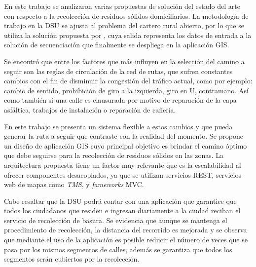 
En este trabajo se analizaron varias propuestas de solución del estado del arte con respecto a la recolección de residuos sólidos domiciliarios. La metodología de trabajo en la DSU se ajusta al problema del cartero rural abierto, por lo que se utiliza la solución propuesta por \citet{Braier2017AnArgentina}, cuya salida representa los datos de entrada a la solución de secuenciación que finalmente se despliega en la aplicación GIS.

Se encontró que entre los factores que más influyen en la selección del camino a seguir son las reglas de circulación de la red de rutas, que sufren constantes cambios con el fin de disminuir la congestión del tráfico actual, como por ejemplo: cambio de sentido, prohibición de giro a la izquierda, giro en U, contramano. Así como también si una calle es clausurada por motivo de reparación de la capa asfáltica, trabajos de instalación o reparación de cañería.

En este trabajo se presenta un sistema flexible a estos cambios y que pueda generar la ruta a seguir que contraste con la realidad del momento. Se propone un diseño de aplicación GIS cuyo principal objetivo es brindar el camino óptimo que debe seguirse para la recolección de residuos sólidos en las zonas. La arquitectura propuesta tiene un factor muy relevante que es la escalabilidad al ofrecer componentes desacoplados, ya que se utilizan servicios REST, servicios web de mapas como \textit{TMS}, y \textit{fameworks} MVC.

Cabe resaltar que la DSU podrá contar con una aplicación que garantice que todos los ciudadanos que residen e ingresan diariamente a la ciudad reciban el servicio de recolección de basura. Se evidencia que aunque se mantenga el procedimiento de recolección, la distancia del recorrido es mejorada y se observa que mediante el uso de la aplicación es posible reducir el número de veces que se pasa por los mismos segmentos de calles, además se garantiza que todos los segmentos serán cubiertos por la recolección.

